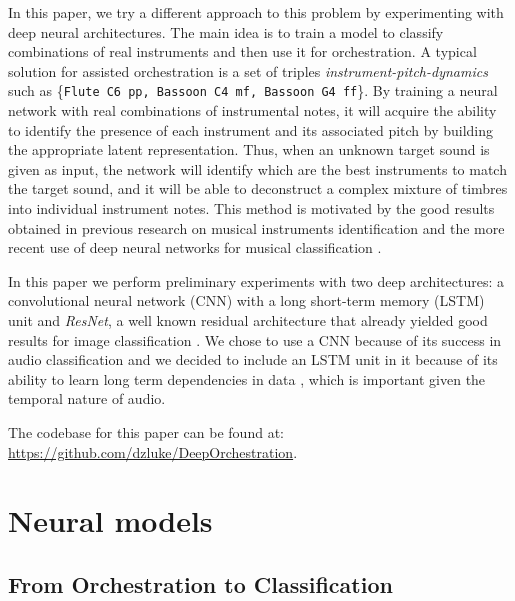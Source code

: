 \documentclass[runningheads,a4paper]{llncs}
\begin{document}
In this paper, we try a different approach to this problem by experimenting with deep neural architectures. The main idea is to train a model to classify combinations of real instruments and then use it for orchestration. A typical solution for assisted orchestration is a set of triples \emph{instrument-pitch-dynamics} such as \{\texttt{Flute C6 pp, Bassoon C4 mf, Bassoon G4 ff}\}. By training a neural network with real combinations of instrumental notes, it will acquire the ability to identify the presence of each instrument and its associated pitch by building the appropriate latent representation. Thus, when an unknown target sound is given as input, the network will identify which are the best instruments to match the target sound, and it will be able to  deconstruct a complex mixture of timbres into individual instrument notes. This method is motivated by the good results obtained in previous research on musical instruments identification \cite{Benetos07, Kitahara05} and the more recent use of deep neural networks for musical classification \cite{lostanlen16, Bian19}. 

In this paper we perform preliminary experiments with two deep architectures: a convolutional neural network (CNN) with a long short-term memory (LSTM) unit and \emph{ResNet}, a well known residual architecture that already yielded good results for image classification \cite{He15}. We chose to use a CNN because of its success in audio classification \cite{Hershey17} and we decided to include an LSTM unit in it because of its ability to learn long term dependencies in data \cite{Hochreiter97}, which is important given the temporal nature of audio.

The codebase for this paper can be found at: \url{https://github.com/dzluke/DeepOrchestration}.

\section{Neural models}
\label{sec:models}



\subsection{From Orchestration to Classification}
\end{document}
